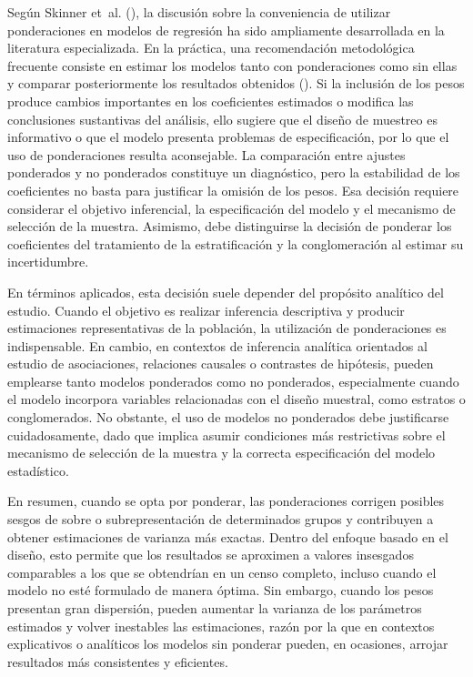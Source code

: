\documentclass[
  spanish,
  11pt,
  letterpaper,
  oneside,
  open=any]{scrbook}
\begin{document}
Según Skinner et~al. (), la
discusión sobre la conveniencia de utilizar ponderaciones en modelos de
regresión ha sido ampliamente desarrollada en la literatura
especializada. En la práctica, una recomendación metodológica frecuente
consiste en estimar los modelos tanto con ponderaciones como sin ellas y
comparar posteriormente los resultados obtenidos
(). Si la inclusión de
los pesos produce cambios importantes en los coeficientes estimados o
modifica las conclusiones sustantivas del análisis, ello sugiere que el
diseño de muestreo es informativo o que el modelo presenta problemas de
especificación, por lo que el uso de ponderaciones resulta aconsejable.
La comparación entre ajustes ponderados y no ponderados constituye un
diagnóstico, pero la estabilidad de los coeficientes no basta para
justificar la omisión de los pesos. Esa decisión requiere considerar el
objetivo inferencial, la especificación del modelo y el mecanismo de
selección de la muestra. Asimismo, debe distinguirse la decisión de
ponderar los coeficientes del tratamiento de la estratificación y la
conglomeración al estimar su incertidumbre.

En términos aplicados, esta decisión suele depender del propósito
analítico del estudio. Cuando el objetivo es realizar inferencia
descriptiva y producir estimaciones representativas de la población, la
utilización de ponderaciones es indispensable. En cambio, en contextos
de inferencia analítica orientados al estudio de asociaciones,
relaciones causales o contrastes de hipótesis, pueden emplearse tanto
modelos ponderados como no ponderados, especialmente cuando el modelo
incorpora variables relacionadas con el diseño muestral, como estratos o
conglomerados. No obstante, el uso de modelos no ponderados debe
justificarse cuidadosamente, dado que implica asumir condiciones más
restrictivas sobre el mecanismo de selección de la muestra y la correcta
especificación del modelo estadístico.

En resumen, cuando se opta por ponderar, las ponderaciones corrigen
posibles sesgos de sobre o subrepresentación de determinados grupos y
contribuyen a obtener estimaciones de varianza más exactas. Dentro del
enfoque basado en el diseño, esto permite que los resultados se
aproximen a valores insesgados comparables a los que se obtendrían en un
censo completo, incluso cuando el modelo no esté formulado de manera
óptima. Sin embargo, cuando los pesos presentan gran dispersión, pueden
aumentar la varianza de los parámetros estimados y volver inestables las
estimaciones, razón por la que en contextos explicativos o analíticos
los modelos sin ponderar pueden, en ocasiones, arrojar resultados más
consistentes y eficientes.
\end{document}
